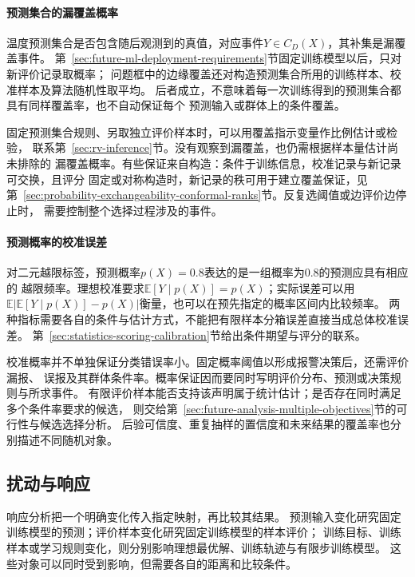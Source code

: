 \paragraph{预测集合的漏覆盖概率}

温度预测集合是否包含随后观测到的真值，对应事件$Y\in C_D(X)$，其补集是漏覆盖事件。
第~\ref{sec:future-ml-deployment-requirements}节固定训练模型以后，只对新评价记录取概率；
问题框中的边缘覆盖还对构造预测集合所用的训练样本、校准样本及算法随机性取平均。
后者成立，不意味着每一次训练得到的预测集合都具有同样覆盖率，也不自动保证每个
预测输入或群体上的条件覆盖。

固定预测集合规则、另取独立评价样本时，可以用覆盖指示变量作比例估计或检验，
联系第~\ref{sec:rv-inference}节。没有观察到漏覆盖，也仍需根据样本量估计尚未排除的
漏覆盖概率。有些保证来自构造：条件于训练信息，校准记录与新记录可交换，且评分
固定或对称构造时，新记录的秩可用于建立覆盖保证，见
第~\ref{sec:probability-exchangeability-conformal-ranks}节。反复选阈值或边评价边停止时，
需要控制整个选择过程涉及的事件。

\paragraph{预测概率的校准误差}

对二元越限标签，预测概率$p(X)=0.8$表达的是一组概率为$0.8$的预测应具有相应的
越限频率。理想校准要求$\mathbb E[Y\mid p(X)]=p(X)$；实际误差可以用
$\mathbb E|\mathbb E[Y\mid p(X)]-p(X)|$衡量，也可以在预先指定的概率区间内比较频率。
两种指标需要各自的条件与估计方式，不能把有限样本分箱误差直接当成总体校准误差。
第~\ref{sec:statistics-scoring-calibration}节给出条件期望与评分的联系。

校准概率并不单独保证分类错误率小。固定概率阈值以形成报警决策后，还需评价漏报、
误报及其群体条件率。概率保证因而要同时写明评价分布、预测或决策规则与所求事件。
有限评价样本能否支持该声明属于统计估计；是否存在同时满足多个条件率要求的候选，
则交给第~\ref{sec:future-analysis-multiple-objectives}节的可行性与候选选择分析。
后验可信度、重复抽样的置信度和未来结果的覆盖率也分别描述不同随机对象。

\subsection{扰动与响应}
\label{sec:future-robustness-security-map}
\label{sec:future-privacy-unlearning-map}

响应分析把一个明确变化传入指定映射，再比较其结果。
预测输入变化研究固定训练模型的预测；评价样本变化研究固定训练模型的样本评价；
训练目标、训练样本或学习规则变化，则分别影响理想最优解、训练轨迹与有限步训练模型。
这些对象可以同时受到影响，但需要各自的距离和比较条件。

